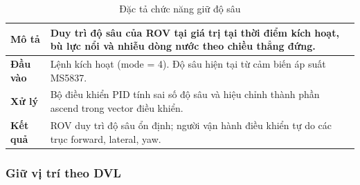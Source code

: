 \documentclass[../DoAn.tex]{subfiles}
\begin{document}
\begin{table}[H]

\centering

\renewcommand{\arraystretch}{1.3}

\begin{tabular}{|l|p{9cm}|}

\hline

\textbf{Mô tả} &
Duy trì độ sâu của ROV tại giá trị tại thời điểm kích hoạt,
bù lực nổi và nhiễu dòng nước theo chiều thẳng đứng. \\

\hline

\textbf{Đầu vào} &
Lệnh kích hoạt (mode = 4). Độ sâu hiện tại từ cảm biến
áp suất MS5837. \\

\hline

\textbf{Xử lý} &
Bộ điều khiển PID tính sai số độ sâu và hiệu chỉnh thành
phần ascend trong vector điều khiển. \\

\hline

\textbf{Kết quả} &
ROV duy trì độ sâu ổn định; người vận hành điều khiển tự do
các trục forward, lateral, yaw. \\

\hline

\end{tabular}

\caption{Đặc tả chức năng giữ độ sâu}

\label{tab:hold_depth}

\end{table}

\subsubsection{Giữ vị trí theo DVL}
\end{document}
